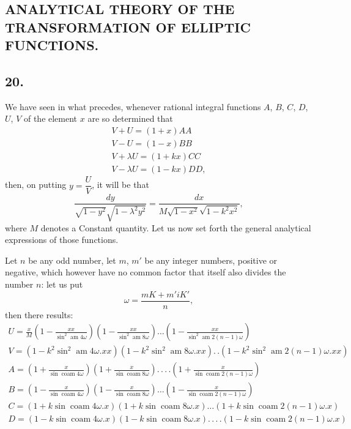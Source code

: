 \documentclass{article}
\begin{document}

\subsection*{ANALYTICAL THEORY OF THE TRANSFORMATION OF ELLIPTIC FUNCTIONS.}

\subsection*{20.}

We have seen in what precedes, whenever rational integral functions $A$, $B$, $C$, $D$, $U$, $V$ of the element $x$ are so determined that
\[
\begin{gathered}
V+U=(1+x)AA\\
V-U=(1-x)BB\\
V+\lambda U=(1+kx)CC\\
V-\lambda U=(1-kx)DD,
\end{gathered}
\]
then, on putting $y=\dfrac{U}{V}$, it will be that
\[
\frac{dy}{\sqrt{1-y^{2}}\sqrt{1-\lambda^{2}y^{2}}}=\frac{dx}{M\sqrt{1-x^{2}}\sqrt{1-k^{2}x^{2}}},
\]
where $M$ denotes a Constant quantity. Let us now set forth the general analytical expressions of those functions.

Let $n$ be any odd number, let $m$, $m'$ be any integer numbers, positive or negative, which however have no common factor that itself also divides the number $n$: let us put
\[
\omega=\frac{mK+m'iK'}{n},
\]
then there results:
\[
\begin{gathered}
U=\frac{x}{M}\left(1-\frac{xx}{\sin^{2}\operatorname{am}4\omega}\right)\left(1-\frac{xx}{\sin^{2}\operatorname{am}8\omega}\right)\ldots\left(1-\frac{xx}{\sin^{2}\operatorname{am}2(n-1)\omega}\right)\\[1.5ex]
V=\left(1-k^{2}\sin^{2}\operatorname{am}4\omega.xx\right)\left(1-k^{2}\sin^{2}\operatorname{am}8\omega.xx\right).\,.\left(1-k^{2}\sin^{2}\operatorname{am}2(n-1)\omega.xx\right)\\[1.5ex]
A=\left(1+\frac{x}{\sin\operatorname{coam}4\omega}\right)\left(1+\frac{x}{\sin\operatorname{coam}8\omega}\right).\,.\,.\,.\left(1+\frac{x}{\sin\operatorname{coam}2(n-1)\omega}\right)\\[1.5ex]
B=\left(1-\frac{x}{\sin\operatorname{coam}4\omega}\right)\left(1-\frac{x}{\sin\operatorname{coam}8\omega}\right)\ldots\left(1-\frac{x}{\sin\operatorname{coam}2(n-1)\omega}\right)\\[1.5ex]
C=\left(1+k\sin\operatorname{coam}4\omega.x\right)\left(1+k\sin\operatorname{coam}8\omega.x\right)\ldots\left(1+k\sin\operatorname{coam}2(n-1)\omega.x\right)\\[1.5ex]
D=\left(1-k\sin\operatorname{coam}4\omega.x\right)\left(1-k\sin\operatorname{coam}8\omega.x\right).\,.\,.\,.\left(1-k\sin\operatorname{coam}2(n-1)\omega.x\right)
\end{gathered}
\]
\end{document}
